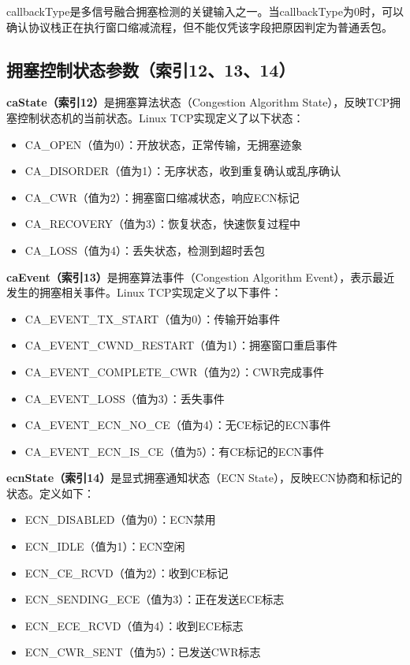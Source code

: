 callbackType是多信号融合拥塞检测的关键输入之一。当callbackType为0时，可以确认协议栈正在执行窗口缩减流程，但不能仅凭该字段把原因判定为普通丢包。

\subsection{拥塞控制状态参数（索引12、13、14）}

\textbf{caState（索引12）}是拥塞算法状态（Congestion Algorithm State），反映TCP拥塞控制状态机的当前状态。Linux TCP实现定义了以下状态：

\begin{itemize}
    \item CA\_OPEN（值为0）：开放状态，正常传输，无拥塞迹象
    \item CA\_DISORDER（值为1）：无序状态，收到重复确认或乱序确认
    \item CA\_CWR（值为2）：拥塞窗口缩减状态，响应ECN标记
    \item CA\_RECOVERY（值为3）：恢复状态，快速恢复过程中
    \item CA\_LOSS（值为4）：丢失状态，检测到超时丢包
\end{itemize}

\textbf{caEvent（索引13）}是拥塞算法事件（Congestion Algorithm Event），表示最近发生的拥塞相关事件。Linux TCP实现定义了以下事件：

\begin{itemize}
    \item CA\_EVENT\_TX\_START（值为0）：传输开始事件
    \item CA\_EVENT\_CWND\_RESTART（值为1）：拥塞窗口重启事件
    \item CA\_EVENT\_COMPLETE\_CWR（值为2）：CWR完成事件
    \item CA\_EVENT\_LOSS（值为3）：丢失事件
    \item CA\_EVENT\_ECN\_NO\_CE（值为4）：无CE标记的ECN事件
    \item CA\_EVENT\_ECN\_IS\_CE（值为5）：有CE标记的ECN事件
\end{itemize}

\textbf{ecnState（索引14）}是显式拥塞通知状态（ECN State），反映ECN协商和标记的状态。定义如下：

\begin{itemize}
    \item ECN\_DISABLED（值为0）：ECN禁用
    \item ECN\_IDLE（值为1）：ECN空闲
    \item ECN\_CE\_RCVD（值为2）：收到CE标记
    \item ECN\_SENDING\_ECE（值为3）：正在发送ECE标志
    \item ECN\_ECE\_RCVD（值为4）：收到ECE标志
    \item ECN\_CWR\_SENT（值为5）：已发送CWR标志
\end{itemize}

